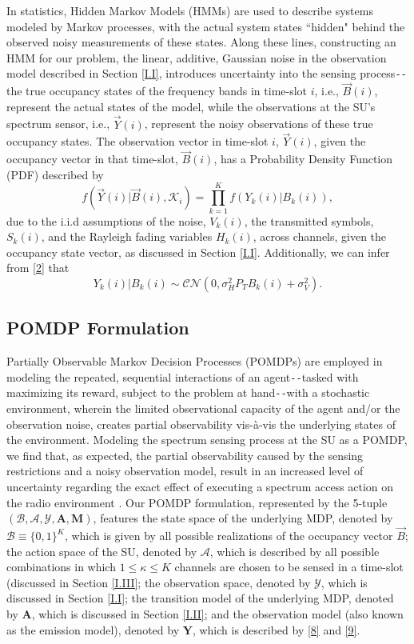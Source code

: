 \documentclass[12pt, draftcls, onecolumn]{IEEEtran}
\begin{document}
In statistics, Hidden Markov Models (HMMs) are used to describe systems modeled by Markov processes, with the actual system states ``hidden" behind the observed noisy measurements of these states. Along these lines, constructing an HMM for our problem, the linear, additive, Gaussian noise in the observation model described in Section \ref{I.I}, introduces uncertainty into the sensing process\texttt{-{}-}the true occupancy states of the frequency bands in time-slot $i$, i.e., $\vec{B}(i)$, represent the actual states of the model, while the observations at the SU's spectrum sensor, i.e., $\vec{Y}(i)$, represent the noisy observations of these true occupancy states. The observation vector in time-slot $i$, $\vec{Y}(i)$, given the occupancy vector in that time-slot, $\vec{B}(i)$, has a Probability Density Function (PDF) described by
\begin{equation}\label{8}
    f(\vec{Y}(i)|\vec{B}(i),\mathcal{K}_{i})=\prod_{k=1}^{K}f(Y_{k}(i)|B_{k}(i)),
\end{equation}
due to the i.i.d assumptions of the noise, $V_{k}(i)$, the transmitted symbols, $S_{k}(i)$, and the Rayleigh fading variables $H_{k}(i)$, across channels, given the occupancy state vector, as discussed in Section \ref{I.I}. Additionally, we can infer from \eqref{2} that
\begin{equation}\label{9}
    Y_{k}(i)|B_{k}(i)\sim\mathcal{CN}(0,\sigma_{H}^{2}P_{T}B_{k}(i)+\sigma_{V}^{2}).
\end{equation}
\subsection{POMDP Formulation}\label{I.IV}
Partially Observable Markov Decision Processes (POMDPs) are employed in modeling the repeated, sequential interactions of an agent\texttt{-{}-}tasked with maximizing its reward, subject to the problem at hand\texttt{-{}-}with a stochastic environment, wherein the limited observational capacity of the agent and/or the observation noise, creates partial observability vis-\`{a}-vis the underlying states of the environment. Modeling the spectrum sensing process at the SU as a POMDP, we find that, as expected, the partial observability caused by the sensing restrictions and a noisy observation model, result in an increased level of uncertainty regarding the exact effect of executing a spectrum access action on the radio environment \cite{WCL:paper}. Our POMDP formulation, represented by the 5-tuple $(\mathcal{B},\mathcal{A},\mathcal{Y},\mathbf{A},\mathbf{M})$, features the state space of the underlying MDP, denoted by $\mathcal{B}{\equiv}\{0,1\}^{K}$, which is given by all possible realizations of the occupancy vector $\vec{B}$; the action space of the SU, denoted by $\mathcal{A}$, which is described by all possible combinations in which $1{\leq}\kappa{\leq}K$ channels are chosen to be sensed in a time-slot (discussed in Section \ref{I.III}; the observation space, denoted by $\mathcal{Y}$, which is discussed in Section \ref{I.I}; the transition model of the underlying MDP, denoted by $\mathbf{A}$, which is discussed in Section \ref{I.II}; and the observation model (also known as the emission model), denoted by $\mathbf{Y}$, which is described by \eqref{8} and \eqref{9}.
\end{document}
